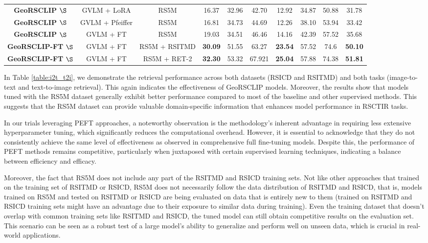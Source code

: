 \documentclass[journal]{IEEEtran}
\begin{document}
\begin{table*}
\begin{tabular}{cccccccccc}
\textbf{GeoRSCLIP} $ \S $ &GVLM + LoRA& RS5M &  16.37  & 32.96  & 42.70  & 12.92   &34.87  & 50.88   &31.78  \\
\textbf{GeoRSCLIP} $ \S $  &GVLM + Pfeiffer & RS5M & 16.81  &34.73  & 44.69   &  12.26  &  38.10  & 53.94  & 33.42 \\
\textbf{GeoRSCLIP} $ \S $ & GVLM + FT & RS5M & 19.03  & 	34.51  & 	46.46 	 & 14.16 	&  42.39  & 	57.52   & 	35.68 \\
\textbf{GeoRSCLIP-FT} $ \S $ & GVLM + FT & RS5M + RSITMD & \textbf{30.09} & 51.55 & 63.27 & \textbf{23.54} &57.52&74.6 & \textbf{50.10}  \\
\textbf{GeoRSCLIP-FT} $ \S $ & GVLM + FT & RS5M + RET-2 &\textbf{32.30} &53.32&67.921&\textbf{25.04}&57.88&74.38 & \textbf{51.81}  \\
\bottomrule
\end{tabular}
\end{table*}

In Table \ref{table:i2t_t2i}, we demonstrate the retrieval performance across both datasets (RSICD and RSITMD) and both tasks (image-to-text and text-to-image retrieval). This again indicates the effectiveness of GeoRSCLIP models. Moreover, the results show that models tuned with the RS5M dataset generally exhibit better performance compared to most of the baseline and other supervised methods. This suggests that the RS5M dataset can provide valuable domain-specific information that enhances model performance in RSCTIR tasks. 

In our trials leveraging PEFT approaches, a noteworthy observation is the methodology's inherent advantage in requiring less extensive hyperparameter tuning, which significantly reduces the computational overhead. However, it is essential to acknowledge that they do not consistently achieve the same level of effectiveness as observed in comprehensive full fine-tuning models. Despite this, the performance of PEFT methods remains competitive, particularly when juxtaposed with certain supervised learning techniques, indicating a balance between efficiency and efficacy. 

Moreover, the fact that RS5M does not include any part of the RSITMD and RSICD training sets. Not like other approaches that trained on the training set of RSITMD or RSICD, RS5M does not necessarily follow the data distribution of RSITMD and RSICD, that is, models trained on RS5M and tested on RSITMD or RSICD are being evaluated on data that is entirely new to them (trained on RSITMD and RSICD training sets might have an advantage due to their exposure to similar data during training). 
Even the training dataset that doesn't overlap with common training sets like RSITMD and RSICD, the tuned model can still obtain competitive results on the evaluation set. This scenario can be seen as a robust test of a large model's ability to generalize and perform well on unseen data, which is crucial in real-world applications. 
\end{document}
